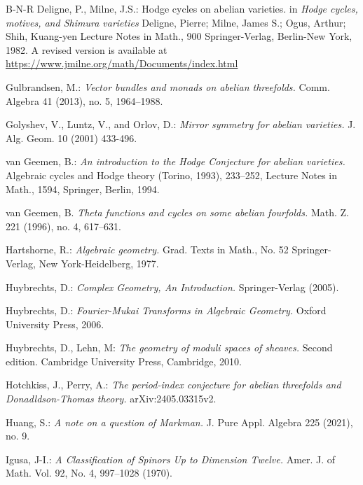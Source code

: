 \documentclass[12pt]{amsart}
\numberwithin{equation}{subsection}
\theoremstyle{plain}
\theoremstyle{definition}
\begin{document}
\begin{thebibliography}{B-N-R}
 Deligne, P., Milne, J.S.: {Hodge cycles on abelian varieties.\/} in {\em Hodge cycles, motives, and Shimura varieties\/}
Deligne, Pierre; Milne, James S.; Ogus, Arthur; Shih, Kuang-yen
Lecture Notes in Math., 900
Springer-Verlag, Berlin-New York, 1982. A revised version is available at \url{https://www.jmilne.org/math/Documents/index.html}

 Gulbrandsen, M.:
{\em Vector bundles and monads on abelian threefolds.\/} Comm. Algebra 41 (2013), no. 5, 1964--1988.

Golyshev, V., Luntz, V., and Orlov, D.:
{\em Mirror symmetry for abelian varieties.\/}
J. Alg. Geom. 10 (2001) 433-496.

 van Geemen, B.: {\em An introduction to the Hodge Conjecture for abelian varieties.\/}
Algebraic cycles and Hodge theory (Torino, 1993), 233--252,
Lecture Notes in Math., 1594, Springer, Berlin, 1994. 

 van Geemen, B.
{\em Theta functions and cycles on some abelian fourfolds.\/}
Math. Z. 221 (1996), no. 4, 617--631. 

 Hartshorne, R.: {\em Algebraic geometry.\/} 
Grad. Texts in Math., No. 52 Springer-Verlag, New York-Heidelberg, 1977.
 
 Huybrechts, D.:
{\em Complex Geometry, An Introduction.\/} Springer-Verlag (2005).

 Huybrechts, D.:
{\em Fourier-Mukai Transforms in Algebraic Geometry.\/}
Oxford University Press, 2006.


 Huybrechts, D., Lehn, M: {\em
The geometry of moduli spaces of sheaves.\/} Second edition. Cambridge University Press, Cambridge, 2010.

 Hotchkiss, J., Perry, A.: {\em The period-index conjecture for abelian threefolds and Donadldson-Thomas theory.\/} arXiv:2405.03315v2.

 Huang, S.: {\em A note on a question of Markman.\/} J. Pure Appl. Algebra 225 (2021), no. 9.

 Igusa, J-I.: {\em A Classification of Spinors Up to Dimension Twelve.\/} Amer. J. of Math. Vol. 92, No. 4, 997--1028 (1970).


\end{thebibliography}
\end{document}
